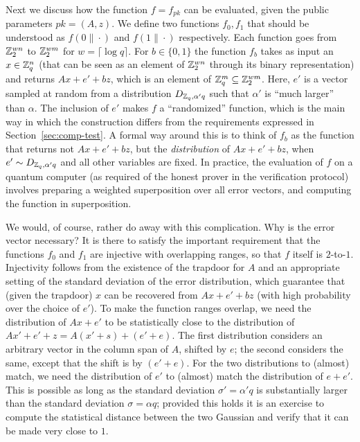 Next we discuss how the function $f=f_{pk}$ can be evaluated, given the public parameters $pk=(A,z)$. We define two functions $f_0,f_1$ that should be understood as $f(0\|\cdot)$ and $f(1\|\cdot)$ respectively. Each function goes from $\mathbb{Z}_2^{wn}$ to $\mathbb{Z}_2^{wm}$ for $w=\lceil \log q \rceil$. For $b\in\{0,1\}$ the function $f_b$ takes as input an $x\in\mathbb{Z}_q^n$ (that can be seen as an element of $\mathbb{Z}_2^{wn}$ through its binary representation) and returns $Ax+e'+b z$, which is an element of $\mathbb{Z}_q^m \subseteq \mathbb{Z}_2^{wm}$. Here, $e'$ is a vector sampled at random from a distribution $D_{\mathbb{Z}_q,\alpha'q}$ such that $\alpha'$ is ``much larger'' than $\alpha$. The inclusion of $e'$ makes $f$ a ``randomized'' function, which is the main way in which the construction differs from the requirements expressed in Section~\ref{sec:comp-test}. A formal way around this is to think of $f_b$ as the function that returns not $Ax+e'+bz$, but the \emph{distribution} of $Ax+e'+bz$, when $e'\sim D_{\mathbb{Z}_q,\alpha'q}$ and all other variables are fixed. In practice, the evaluation of $f$ on a quantum computer (as required of the honest prover in the verification protocol) involves preparing a weighted superposition over all error vectors, and computing the function in superposition. 

We would, of course, rather do away with this complication. Why is the error vector necessary? It is there to satisfy the important requirement that the functions $f_0$ and $f_1$ are injective with overlapping ranges, so that $f$ itself is $2$-to-$1$. Injectivity follows from the existence of the trapdoor for $A$ and an appropriate setting of the standard deviation of the error distribution, which guarantee that (given the trapdoor) $x$ can  be recovered from $Ax+e'+bz$ (with high probability over the choice of $e'$). To make the function ranges overlap, we need the distribution of $Ax+e'$ to be statistically close to the distribution of $Ax'+e'+z = A(x'+s)+(e'+e)$. The first distribution considers an arbitrary vector in the column span of $A$, shifted by $e$; the second considers the same, except that the shift is by $(e'+e)$. For the two distributions to (almost) match, we need the distribution of $e'$ to (almost) match the distribution of $e+e'$. This is possible as long as the standard deviation $\sigma'=\alpha'q$ is substantially larger than the standard deviation $\sigma=\alpha q$; provided this holds it is an exercise to compute the statistical distance between the two Gaussian and verify that it can be made very close to $1$. 

